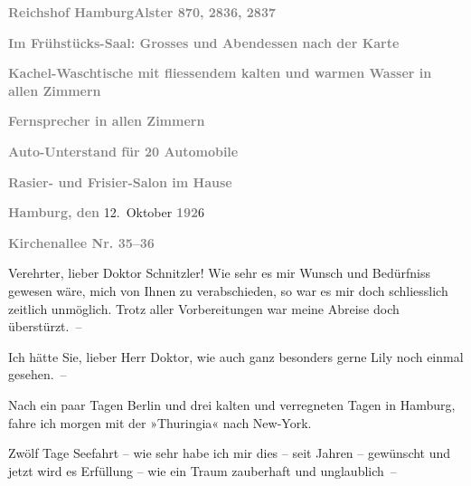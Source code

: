 \pstart
           \textcolor{gray}{\textbf{Reichshof Hamburg}}\hfill \textcolor{gray}{\textbf{Alster 870, 2836, 2837}}\pend
           
\pstart
           \centering{}\textcolor{gray}{\textbf{Im Frühstücks-Saal: Grosses und Abendessen nach der
                     Karte}}\pend
           
\pstart
           \centering{}\textcolor{gray}{\textbf{Kachel-Waschtische mit fliessendem kalten und warmen Wasser
                     in allen Zimmern}}\pend
           
\pstart
           \textcolor{gray}{\textbf{Fernsprecher in allen Zimmern}}\pend
           
\pstart
           \textcolor{gray}{\textbf{Auto-Unterstand für 20 Automobile}}\pend
           
\pstart
           \textcolor{gray}{\textbf{Rasier- und Frisier-Salon im Hause}}\pend
           
\pstart
           \raggedleft{}\textcolor{gray}{\textbf{Hamburg, den}}{ }12. Oktober \textcolor{gray}{\textbf{192}}6\pend
           
\pstart
           \raggedleft{}\textcolor{gray}{\textbf{Kirchenallee Nr. 35–36}}\pend
           
\pstart{}Verehrter, lieber Doktor Schnitzler!\pend\vspace{0.5em}
\pstart
           Wie sehr es mir Wunsch und Bedürfniss gewesen wäre, mich von Ihnen zu verabschieden,
               so war es mir doch schliesslich zeitlich unmöglich. Trotz aller Vorbereitungen war
               meine Abreise doch überstürzt. –\pend
           
\pstart
           Ich hätte Sie, lieber Herr Doktor, wie auch ganz besonders gerne Lily noch einmal gesehen. –\pend
           
\pstart
           Nach ein paar Tagen Berlin und drei kalten und
               verregneten Tagen in Hamburg, fahre ich morgen
               mit der »Thuringia« nach New-York.\pend
           
\pstart
           Zwölf Tage Seefahrt – wie sehr habe ich mir dies – seit Jahren – gewünscht und jetzt
               wird es Erfüllung – wie ein Traum zauberhaft und unglaublich –\pend
           
